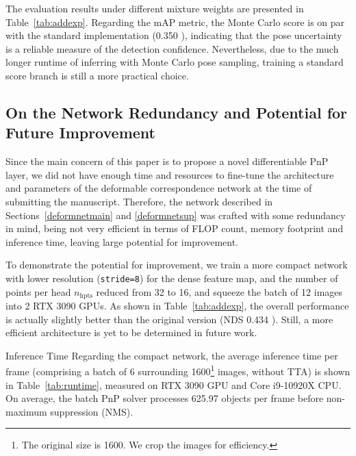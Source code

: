 \documentclass[10pt,twocolumn,letterpaper]{article}
\makeatletter
\renewcommand{\paragraph}{
  \@startsection{paragraph}{4}
  {\z@}{1.0ex \@plus 0ex \@minus .3ex}{-1em}
  {\normalfont\normalsize\bfseries}
}
\makeatother
\begin{document}
The evaluation results under different mixture weights are presented in Table~\ref{tab:addexp}. Regarding the mAP metric, the Monte Carlo score is on par with the standard implementation (0.350  ), indicating that the pose uncertainty is a reliable measure of the detection confidence. Nevertheless, due to the much longer runtime of inferring with Monte Carlo pose sampling, training a standard score branch is still a more practical choice.

\subsection{On the Network Redundancy and Potential for Future Improvement}
Since the main concern of this paper is to propose a novel differentiable PnP layer, we did not have enough time and resources to fine-tune the architecture and parameters of the deformable correspondence network at the time of submitting the manuscript. Therefore, the network described in Sections~\ref{deformnetmain} and \ref{deformnetsup} was crafted with some redundancy in mind, being not very efficient in terms of FLOP count, memory footprint and inference time, leaving large potential for improvement.



To demonstrate the potential for improvement, we train a more compact network with lower resolution (\texttt{stride=8}) for the dense feature map, and the number of points per head $n_\text{hpts}$ reduced from 32 to 16, and squeeze the batch of 12 images into 2 RTX 3090 GPUs. As shown in Table~\ref{tab:addexp}, the overall performance is actually slightly better than the original version (NDS 0.434 ). Still, a more efficient architecture is yet to be determined in future work.

\paragraph{Inference Time}
Regarding the compact network, the average inference time per frame (comprising a batch of 6 surrounding 1600\footnote{The original size is 1600. We crop the images for efficiency.} images, without TTA) is shown in Table~\ref{tab:runtime}, measured on RTX 3090 GPU and Core i9-10920X CPU. On average, the batch PnP solver processes 625.97 objects per frame before non-maximum suppression (NMS).
\end{document}
